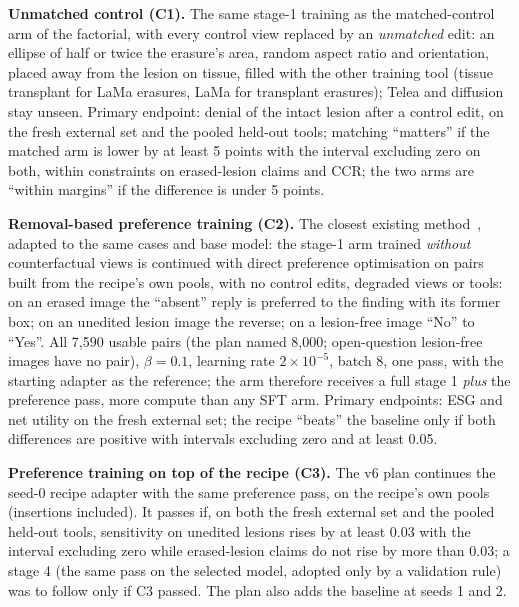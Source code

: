 \documentclass[11pt]{article}
\begin{document}
\textbf{Unmatched control (C1).} The same stage-1 training as the matched-control arm of the factorial, with every control view replaced by an \emph{unmatched} edit: an ellipse of half or twice the erasure's area, random aspect ratio and orientation, placed away from the lesion on tissue, filled with the other training tool (tissue transplant for LaMa erasures, LaMa for transplant erasures); Telea and diffusion stay unseen. Primary endpoint: denial of the intact lesion after a control edit, on the fresh external set and the pooled held-out tools; matching ``matters'' if the matched arm is lower by at least 5 points with the interval excluding zero on both, within constraints on erased-lesion claims and CCR; the two arms are ``within margins'' if the difference is under 5 points.

\textbf{Removal-based preference training (C2).} The closest existing method~\cite{removed}, adapted to the same cases and base model: the stage-1 arm trained \emph{without} counterfactual views is continued with direct preference optimisation on pairs built from the recipe's own pools, with no control edits, degraded views or tools: on an erased image the ``absent'' reply is preferred to the finding with its former box; on an unedited lesion image the reverse; on a lesion-free image ``No'' to ``Yes''. All 7,590 usable pairs (the plan named 8,000; open-question lesion-free images have no pair), $\beta=0.1$, learning rate $2\times10^{-5}$, batch 8, one pass, with the starting adapter as the reference; the arm therefore receives a full stage 1 \emph{plus} the preference pass, more compute than any SFT arm. Primary endpoints: ESG and net utility on the fresh external set; the recipe ``beats'' the baseline only if both differences are positive with intervals excluding zero and at least 0.05.

\textbf{Preference training on top of the recipe (C3).} The v6 plan continues the seed-0 recipe adapter with the same preference pass, on the recipe's own pools (insertions included). It passes if, on both the fresh external set and the pooled held-out tools, sensitivity on unedited lesions rises by at least 0.03 with the interval excluding zero while erased-lesion claims do not rise by more than 0.03; a stage 4 (the same pass on the selected model, adopted only by a validation rule) was to follow only if C3 passed. The plan also adds the baseline at seeds 1 and 2.
\end{document}
